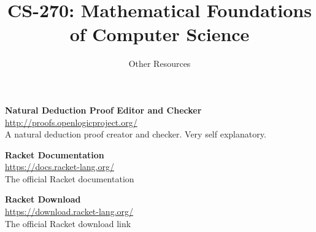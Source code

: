 \documentclass[10pt,letterpaper,oneside]{article}
\title{CS-270: Mathematical Foundations of Computer Science}
\author{Other Resources}
\date{}
\begin{document}
\maketitle

\textbf{Natural Deduction Proof Editor and Checker} \\
\url{http://proofs.openlogicproject.org/} \\
A natural deduction proof creator and checker.
Very self explanatory.
\vspace{5mm}

\textbf{Racket Documentation} \\
\url{https://docs.racket-lang.org/} \\
The official Racket documentation
\vspace{5mm}

\textbf{Racket Download} \\
\url{https://download.racket-lang.org/} \\
The official Racket download link
\vspace{5mm}
\end{document}
